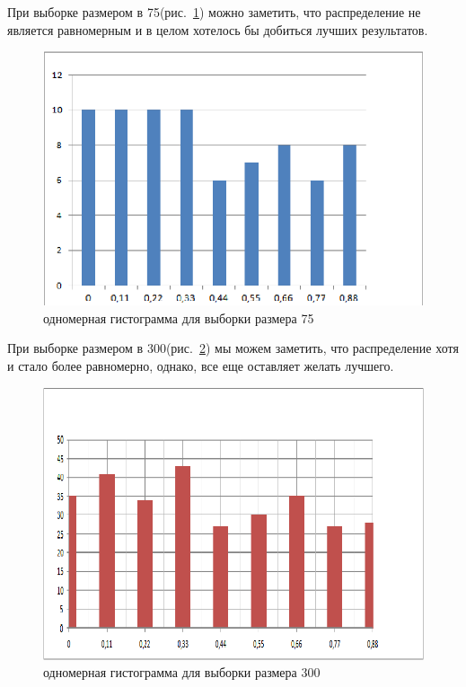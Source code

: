\documentclass[a4paper,12pt]{article}
\begin{document}
При выборке размером в 75(рис.~\ref{fig:im2D_1}) можно заметить, что распределение не является равномерным и в целом хотелось бы добиться лучших результатов.
\begin{center}
	\begin{figure}[h]
	    \centering
   		\includegraphics[scale=0.25]{figure_1.png}
   		\caption{одномерная гистограмма для выборки размера 75}
   		\label{fig:im2D_1}
    \end{figure}
\end{center}

При выборке размером в 300(рис.~\ref{fig:im2D_2}) мы можем заметить, что распределение хотя и стало более равномерно, однако, все еще оставляет желать лучшего.
\begin{center}
	\begin{figure}[h]
		\centering
   		\includegraphics[scale=0.25]{figure_2.png}
   		\caption{одномерная гистограмма для выборки размера 300}
   		\label{fig:im2D_2}
    \end{figure}
\end{center}
\end{document}
